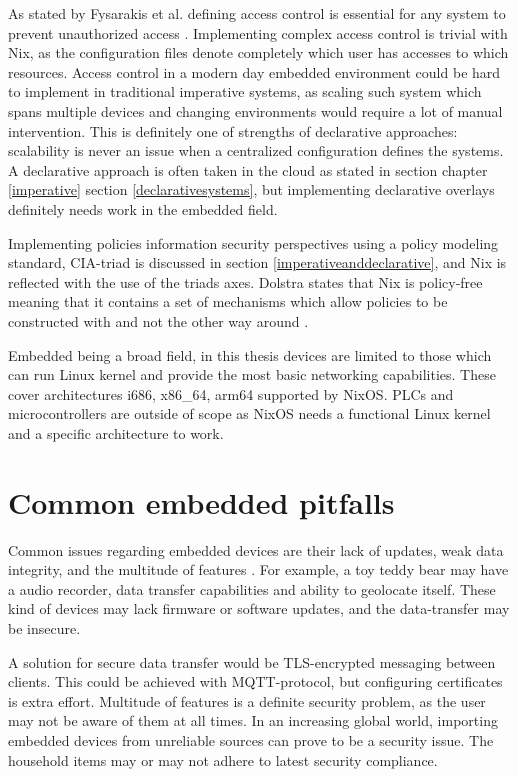 As stated by Fysarakis et al. defining access control is essential
for any system to prevent unauthorized access
\cite{fysarakis2014embedded}. Implementing complex access control is
trivial with Nix, as the configuration files denote completely which
user has accesses to which resources. Access control in a modern day
embedded environment could be hard to implement in traditional
imperative systems, as scaling such system which spans
multiple devices and changing environments would require a lot of
manual intervention. This is definitely one of strengths of
declarative approaches: scalability is never an issue when a
centralized configuration defines the systems. A declarative approach
is often taken in the cloud as stated in section chapter
\ref{imperative} section \ref{declarativesystems}, but implementing
declarative overlays definitely needs work in the embedded field.

Implementing policies information security perspectives using a policy
modeling standard, CIA-triad is discussed in section
\ref{imperativeanddeclarative}, and Nix is reflected with the use of
the triads axes. Dolstra states that Nix is policy-free meaning that
it contains a set of mechanisms which allow policies to be constructed
with and not the other way around \cite{dolstra2004nix}.

Embedded being a broad field, in this thesis devices are limited to
those which can run Linux kernel and provide the most basic networking
capabilities. These cover architectures i686, x86\_64, arm64 supported
by NixOS. PLCs and microcontrollers are outside of scope as NixOS
needs a functional Linux kernel and a specific architecture to work.

\section{Common embedded pitfalls}

Common issues regarding embedded devices are their lack of updates,
weak data integrity, and the multitude of features
\cite{kemmerer2003cybersecurity fysarakis2014embedded}. For example,
a toy teddy bear may have a audio recorder, data transfer capabilities
and ability to geolocate itself. These kind of devices may lack
firmware or software updates, and the data-transfer may be insecure.

A solution for secure data transfer would be TLS-encrypted messaging
between clients. This could be achieved with MQTT-protocol, but
configuring certificates is extra effort. Multitude of features is a
definite security problem, as the user may not be aware of them at all
times. In an increasing global world, importing embedded devices from
unreliable sources can prove to be a security issue. The household
items may or may not adhere to latest security
compliance. \cite{fysarakis2014embedded}

